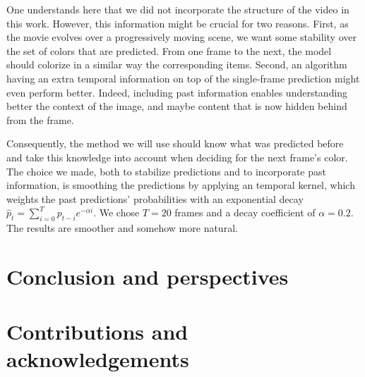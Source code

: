 \documentclass[10pt,twocolumn,letterpaper]{article}
\begin{document}
One understands here that we did not incorporate the structure of the video in this work. However, this information might be crucial for two reasons. First, as the movie evolves over a progressively moving scene, we want some stability over the set of colors that are predicted. From one frame to the next, the model should colorize in a similar way the corresponding items. Second, an algorithm having an extra temporal information on top of the single-frame prediction might even perform better. Indeed, including past information enables understanding better the context of the image, and maybe content that is now hidden behind from the frame.

Consequently, the method we will use should know what was predicted before and take this knowledge into account when deciding for the next frame's color. The choice we made, both to stabilize predictions and to incorporate past information, is smoothing the predictions by applying an temporal kernel, which weights the past predictions' probabilities with an exponential decay $\hat p_t = \sum_{i = 0}^T p_{t-i} e^{-\alpha i}$. We chose $T=20$ frames and a decay coefficient of $\alpha=0.2$. The results are smoother and somehow more natural.


\section{Conclusion and perspectives}
\section*{Contributions and acknowledgements}


{\small


}
\end{document}
